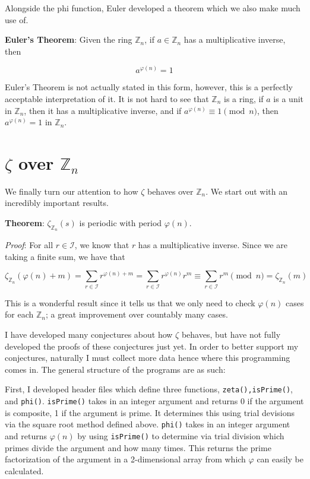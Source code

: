 \documentclass{amsart}
\begin{document}
Alongside the phi function, Euler developed a theorem which we also make much use of.

\hfill\break

\noindent\textbf{Euler's Theorem}: Given the ring $\mathbb{Z}_n$, if $a\in\mathbb{Z}_n$ has a multiplicative inverse, then

$$a^{\varphi(n)}=1$$

\hfill\break

Euler's Theorem is not actually stated in this form, however, this is a perfectly acceptable interpretation of it. It is not hard to see that $\mathbb{Z}_n$ is a ring, if $a$ is a unit in $\mathbb{Z}_n$, then it has a multiplicative inverse, and if $a^{\varphi(n)}\equiv1\pmod{n}$, then $a^{\varphi(n)}=1$ in $\mathbb{Z}_n$.

\hfill\break

\section{\(\zeta\) over \(\mathbb{Z}_n\)}

We finally turn our attention to how $\zeta$ behaves over $\mathbb{Z}_n$. We start out with an incredibly important results.

\hfill\break

\noindent\textbf{Theorem}: $\zeta_{\mathbb{Z}_n}(s)$ is periodic with period $\varphi(n)$.

\noindent\textit{Proof}: For all $r\in\mathcal{I}$, we know that $r$ has a multiplicative inverse. Since we are taking a finite sum, we have that

$$\zeta_{\mathbb{Z}_n}(\varphi(n)+m)=\sum_{r\in\mathcal{I}}r^{\varphi(n)+m}=\sum_{r\in\mathcal{I}}r^{\varphi(n)}r^m\equiv\sum_{r\in\mathcal{I}}r^m\pmod{n}=\zeta_{\mathbb{Z}_n}(m)$$

\hfill\break

This is a wonderful result since it tells us that we only need to check $\varphi(n)$ cases for each $\mathbb{Z}_n$; a great improvement over countably many cases.

I have developed many conjectures about how $\zeta$ behaves, but have not fully developed the proofs of these conjectures just yet. In order to better support my conjectures, naturally I must collect more data hence where this programming comes in. The general structure of the programs are as such:

First, I developed header files which define three functions, {\tt zeta(),isPrime()}, and {\tt phi()}. {\tt isPrime()} takes in an integer argument and returns 0 if the argument is composite, 1 if the argument is prime. It determines this using trial devisions via the square root method defined above. {\tt phi()} takes in an integer argument and returns $\varphi(n)$ by using {\tt isPrime()} to determine via trial division which primes divide the argument and how many times. This returns the prime factorization of the argument in a 2-dimensional array from which $\varphi$ can easily be calculated.
\end{document}
